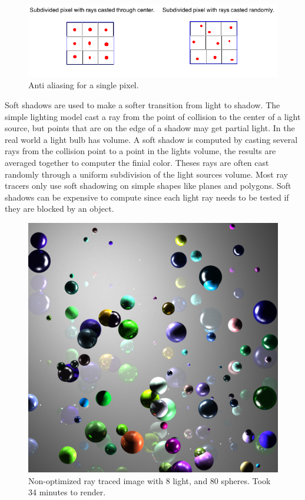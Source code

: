 \documentclass[11pt,a4paper,oneside]{article}
\begin{document}
\begin{figure}[H]
\includegraphics[scale=0.6]{aa.png} 
\caption{Anti aliasing for a single pixel.}
\label{aa}
\end{figure}

Soft shadows are used to make a softer transition from light to shadow.     The simple lighting model cast a ray from the point of collision to the center of a light source, but points that are on the edge of a shadow may get partial light.  In the real world a light bulb has volume.  A soft shadow is computed by casting several rays from the collision point to a point in the lights volume, the results are averaged together to computer the finial color.  Theses rays are often cast randomly through a uniform subdivision of the light sources volume.  Most ray tracers only use soft shadowing on simple shapes like planes and polygons.  Soft shadows can be expensive to compute since each light ray needs to be tested if they are blocked by an object.

\begin{figure}[H]
\begin{center}
\includegraphics[scale=0.21]{result1.png} 
\caption{Non-optimized ray traced image with 8 light, and 80 spheres.  Took 34 minutes to render.}
\label{result1}
\end{center}
\end{figure}
\end{document}
